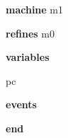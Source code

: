 \begin{block}
  \item   \textbf{machine} m1
  \item   \textbf{refines} m0
  \item   \textbf{variables}
  \begin{block}
    \item   pc
  \end{block}
  \item   
  \item   \textbf{events}
  \begin{block}
    \item   
  \end{block}
  \item   \textbf{end} \\
\end{block}
